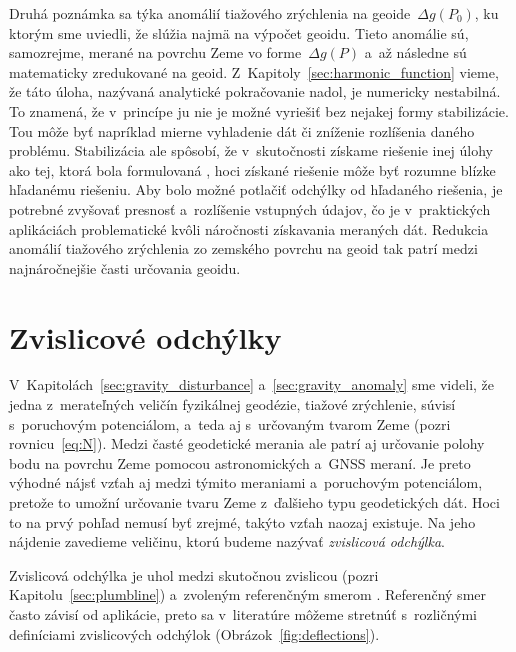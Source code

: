 \documentclass[a4paper, 12pt]{book}
\begin{document}
Druhá poznámka sa týka anomálií tiažového zrýchlenia na geoide~$\Delta g(P_0)$, 
ku ktorým sme uviedli, že slúžia najmä na výpočet geoidu.  Tieto anomálie sú, 
samozrejme, merané na povrchu Zeme vo forme~$\Delta g(P)$ a~až následne sú 
matematicky zredukované na geoid.  Z~Kapitoly~\ref{sec:harmonic_function} 
vieme, že táto úloha, nazývaná analytické pokračovanie nadol, je numericky 
nestabilná.  To znamená, že v~princípe ju nie je možné vyriešiť bez nejakej 
formy stabilizácie.  Tou môže byť napríklad mierne vyhladenie dát či zníženie 
rozlíšenia daného problému.  Stabilizácia ale spôsobí, že v~skutočnosti získame 
riešenie inej úlohy ako tej, ktorá bola formulovaná 
\parencite{SansoGeodeticBoundaryValueProblem}, hoci získané riešenie môže byť 
rozumne blízke hľadanému riešeniu.  Aby bolo možné potlačiť odchýlky od 
hľadaného riešenia, je potrebné zvyšovať presnosť a~rozlíšenie vstupných 
údajov, čo je v~praktických aplikáciách problematické kvôli náročnosti 
získavania meraných dát.  Redukcia anomálií tiažového zrýchlenia zo zemského 
povrchu na geoid tak patrí medzi najnáročnejšie časti určovania geoidu.





\section{Zvislicové odchýlky}
\label{sec:deflections}

V~Kapitolách~\ref{sec:gravity_disturbance} a~\ref{sec:gravity_anomaly} sme 
videli, že jedna z~merateľných veličín fyzikálnej geodézie, tiažové zrýchlenie, 
súvisí s~poruchovým potenciálom, a~teda aj s~určovaným tvarom Zeme (pozri 
rovnicu~\ref{eq:N}).  Medzi časté geodetické merania ale patrí aj určovanie 
polohy bodu na povrchu Zeme pomocou astronomických a~GNSS meraní.  Je preto 
výhodné nájsť vzťah aj medzi týmito meraniami a~poruchovým potenciálom, pretože 
to umožní určovanie tvaru Zeme z~ďalšieho typu geodetických dát.  Hoci to na 
prvý pohľad nemusí byť zrejmé, takýto vzťah naozaj existuje.  Na jeho nájdenie 
zavedieme veličinu, ktorú budeme nazývať \emph{zvislicová odchýlka}.

Zvislicová odchýlka je uhol medzi skutočnou zvislicou (pozri 
Kapitolu~\ref{sec:plumbline}) a~zvoleným referenčným smerom 
\parencite{TorgeGeodesy}.  Referenčný smer často závisí od aplikácie, preto sa 
v~literatúre môžeme stretnúť s~rozličnými definíciami zvislicových odchýlok 
(Obrázok~\ref{fig:deflections}).
\end{document}
